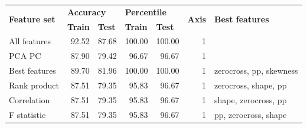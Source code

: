 \begin{table}[h]
\begin{adjustbox}{width=\textwidth}
\begin{tabular}{|l|rr|rr|r|l|}
\hline
\multirow{2}{*}{\textbf{Feature set}} & \multicolumn{2}{l|}{\textbf{Accuracy}}                                   & \multicolumn{2}{l|}{\textbf{Percentile}}                 & \multicolumn{1}{l|}{\multirow{2}{*}{\textbf{Axis}}} & \multirow{2}{*}{\textbf{Best features}} \\ \cline{2-5}
                                      & \multicolumn{1}{l|}{\textbf{Train}} & \multicolumn{1}{l|}{\textbf{Test}} & \multicolumn{1}{l|}{\textbf{Train}} & \multicolumn{1}{l|}{\textbf{Test}} & \multicolumn{1}{l|}{}                               &                                         \\ \hline
All features                          & \multicolumn{1}{r|}{92.52}          & 87.68                              & \multicolumn{1}{r|}{100.00}         & 100.00                             & 1                                                   &                                         \\ \hline
PCA PC                                & \multicolumn{1}{r|}{87.90}          & 79.42                              & \multicolumn{1}{r|}{96.67}          & 96.67                              & 1                                                   &                                         \\ \hline
Best features                         & \multicolumn{1}{r|}{89.70}          & 81.96                              & \multicolumn{1}{r|}{100.00}         & 100.00                             & 1                                                   & zerocross, pp, skewness                 \\ \hline
Rank product                          & \multicolumn{1}{r|}{87.51}          & 79.35                              & \multicolumn{1}{r|}{95.83}          & 96.67                              & 1                                                   & zerocross, shape, pp                    \\ \hline
Correlation                           & \multicolumn{1}{r|}{87.51}          & 79.35                              & \multicolumn{1}{r|}{95.83}          & 96.67                              & 1                                                   & shape, zerocross, pp                    \\ \hline
F statistic                           & \multicolumn{1}{r|}{87.51}          & 79.35                              & \multicolumn{1}{r|}{95.83}          & 96.67                              & 1                                                   & pp, zerocross, shape                    \\ \hline

\end{tabular}
\end{adjustbox}
\end{table}
